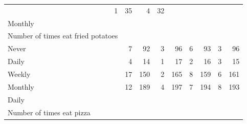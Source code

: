 \documentclass{article}
\begin{document}
\begin{table}[!h]
{\begin{tabular}{lllllllll}
			\multicolumn{1}{r}{1} &
			\multicolumn{1}{r}{35} &
			\multicolumn{1}{r}{4} &
			\multicolumn{1}{r}{32} \\
			\multicolumn{1}{l}{\hspace{3em}Monthly} &
			\multicolumn{1}{|r}{} &
			\multicolumn{1}{r}{} &
			\multicolumn{1}{r}{} &
			\multicolumn{1}{r}{} &
			\multicolumn{1}{r}{} &
			\multicolumn{1}{r}{} &
			\multicolumn{1}{r}{} &
			\multicolumn{1}{r}{} \\
			\multicolumn{1}{l}{\hspace{4em}Number of times eat fried potatoes} &
			\multicolumn{1}{|r}{} &
			\multicolumn{1}{r}{} &
			\multicolumn{1}{r}{} &
			\multicolumn{1}{r}{} &
			\multicolumn{1}{r}{} &
			\multicolumn{1}{r}{} &
			\multicolumn{1}{r}{} &
			\multicolumn{1}{r}{} \\
			\multicolumn{1}{l}{\hspace{5em}Never} &
			\multicolumn{1}{|r}{7} &
			\multicolumn{1}{r}{92} &
			\multicolumn{1}{r}{3} &
			\multicolumn{1}{r}{96} &
			\multicolumn{1}{r}{6} &
			\multicolumn{1}{r}{93} &
			\multicolumn{1}{r}{3} &
			\multicolumn{1}{r}{96} \\
			\multicolumn{1}{l}{\hspace{5em}Daily} &
			\multicolumn{1}{|r}{4} &
			\multicolumn{1}{r}{14} &
			\multicolumn{1}{r}{1} &
			\multicolumn{1}{r}{17} &
			\multicolumn{1}{r}{2} &
			\multicolumn{1}{r}{16} &
			\multicolumn{1}{r}{3} &
			\multicolumn{1}{r}{15} \\
			\multicolumn{1}{l}{\hspace{5em}Weekly} &
			\multicolumn{1}{|r}{17} &
			\multicolumn{1}{r}{150} &
			\multicolumn{1}{r}{2} &
			\multicolumn{1}{r}{165} &
			\multicolumn{1}{r}{8} &
			\multicolumn{1}{r}{159} &
			\multicolumn{1}{r}{6} &
			\multicolumn{1}{r}{161} \\
			\multicolumn{1}{l}{\hspace{5em}Monthly} &
			\multicolumn{1}{|r}{12} &
			\multicolumn{1}{r}{189} &
			\multicolumn{1}{r}{4} &
			\multicolumn{1}{r}{197} &
			\multicolumn{1}{r}{7} &
			\multicolumn{1}{r}{194} &
			\multicolumn{1}{r}{8} &
			\multicolumn{1}{r}{193} \\
			\multicolumn{1}{l}{\hspace{1em}Daily} &
			\multicolumn{1}{|r}{} &
			\multicolumn{1}{r}{} &
			\multicolumn{1}{r}{} &
			\multicolumn{1}{r}{} &
			\multicolumn{1}{r}{} &
			\multicolumn{1}{r}{} &
			\multicolumn{1}{r}{} &
			\multicolumn{1}{r}{} \\
			\multicolumn{1}{l}{\hspace{2em}Number of times eat pizza} &

\end{tabular}}
\end{table}
\end{document}
